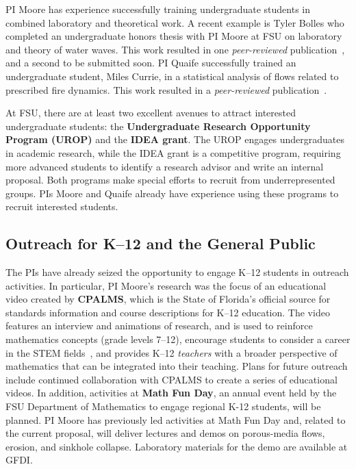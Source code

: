 \documentclass[11pt]{article}
\begin{document}
PI Moore has experience successfully training undergraduate students in combined laboratory and theoretical work. A recent example is Tyler Bolles who completed an undergraduate honors thesis with PI Moore at FSU on laboratory and theory of water waves. This work resulted in one {\em peer-reviewed} publication~\cite{Bolles2019}, and a second to be submitted soon. PI Quaife successfully trained an undergraduate student, Miles Currie, in a statistical analysis of flows related to prescribed fire dynamics.  This work resulted in a {\em peer-reviewed} publication~\cite{cur-spe-hie-obr-goo-qua2018}.

At FSU, there are at least two excellent avenues to attract interested undergraduate students: the {\bf Undergraduate Research Opportunity Program (UROP)} and the {\bf IDEA grant}. The UROP engages undergraduates in academic research, while the IDEA grant is a competitive program, requiring more advanced students to identify a research advisor and write an internal proposal. Both programs make special efforts to recruit from underrepresented groups. PIs Moore and Quaife already have experience using these programs to recruit interested students.

\subsection{Outreach for K--12 and the General Public}
The PIs have already seized the opportunity to engage K--12 students in outreach activities. In particular, PI Moore's research was the focus of an educational video created by {\bf CPALMS}, which is the State of Florida's official source for standards information and course descriptions for K--12 education. The video features an interview and animations of research, and is used to reinforce mathematics concepts (grade levels 7--12), encourage students to consider a career in the STEM fields~\cite{CPALMS}, and provides K--12 {\em teachers} with a broader perspective of mathematics that can be integrated into their teaching. Plans for future outreach include continued collaboration with CPALMS to create a series of educational videos.  In addition, activities at {\bf Math Fun Day}, an annual event held by the FSU Department of Mathematics to engage regional K-12 students, will be planned. PI Moore has previously led activities at Math Fun Day and, related to the current proposal, will deliver lectures and demos on porous-media flows, erosion, and sinkhole collapse. Laboratory materials for the demo are available at GFDI.
\end{document}
